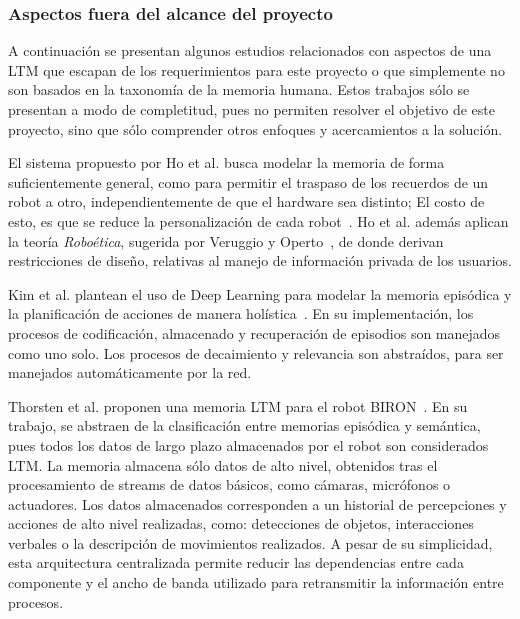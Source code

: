 \subsubsection{Aspectos fuera del alcance del proyecto}\label{sec:otros_aspectos}

A continuación se presentan algunos estudios relacionados con aspectos de una LTM que escapan de los requerimientos para este proyecto o que simplemente no son basados en la taxonomía de la memoria humana. Estos trabajos sólo se presentan a modo de completitud, pues no permiten resolver el objetivo de este proyecto, sino que sólo comprender otros enfoques y acercamientos a la solución. 

El sistema propuesto por Ho et al. busca modelar la memoria de forma suficientemente general, como para permitir el traspaso de los recuerdos de un robot a otro, independientemente de que el hardware sea distinto; El costo de esto, es que se reduce la personalización de cada robot~\cite{Ho2009}. Ho et al. además aplican la teoría \textit{Roboética}, sugerida por Veruggio y Operto~\cite{Veruggio2006}, de donde derivan restricciones de diseño, relativas al manejo de información privada de los usuarios.

Kim et al. plantean el uso de Deep Learning para modelar la memoria episódica y la planificación de acciones de manera holística~\cite{KimMinJoo2016}. En su implementación, los procesos de codificación, almacenado y recuperación de episodios son manejados como uno solo. Los procesos de decaimiento y relevancia son abstraídos, para ser manejados automáticamente por la red.

Thorsten et al. proponen una memoria LTM para el robot BIRON~\cite{Spexard2008}. En su trabajo, se abstraen de la clasificación entre memorias episódica y semántica, pues todos los datos de largo plazo almacenados por el robot son considerados LTM. La memoria almacena sólo datos de alto nivel, obtenidos tras el procesamiento de streams de datos básicos, como cámaras, micrófonos o actuadores. Los datos almacenados corresponden a un historial de percepciones y acciones de alto nivel realizadas, como: detecciones de objetos, interacciones verbales o la descripción de movimientos realizados. A pesar de su simplicidad, esta arquitectura centralizada permite reducir las dependencias entre cada componente y el ancho de banda utilizado para retransmitir la información entre procesos.

